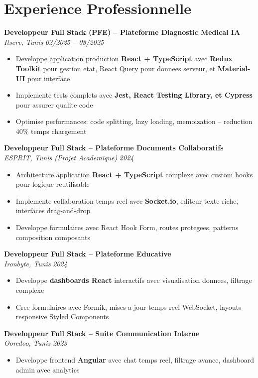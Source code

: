 \documentclass[10pt,a4paper]{article}
\begin{document}
\section*{Experience Professionnelle}
{\small

\textbf{Developpeur Full Stack (PFE) -- Plateforme Diagnostic Medical IA}\\[1pt]
\textit{Itserv, Tunis} \hfill \textit{02/2025 -- 08/2025}
\begin{itemize}[leftmargin=12pt,itemsep=2pt,topsep=3pt,parsep=0pt]
  \item Developpe application production \textbf{React + TypeScript} avec \textbf{Redux Toolkit} pour gestion etat, React Query pour donnees serveur, et \textbf{Material-UI} pour interface
  \item Implemente tests complets avec \textbf{Jest, React Testing Library, et Cypress} pour assurer qualite code
  \item Optimise performances: code splitting, lazy loading, memoization -- reduction 40\% temps chargement
\end{itemize}

\vspace{3pt}
\textbf{Developpeur Full Stack -- Plateforme Documents Collaboratifs}\\[1pt]
\textit{ESPRIT, Tunis (Projet Academique)} \hfill \textit{2024}
\begin{itemize}[leftmargin=12pt,itemsep=2pt,topsep=3pt,parsep=0pt]
  \item Architecture application \textbf{React + TypeScript} complexe avec custom hooks pour logique reutilisable
  \item Implemente collaboration temps reel avec \textbf{Socket.io}, editeur texte riche, interfaces drag-and-drop
  \item Developpe formulaires avec React Hook Form, routes protegees, patterns composition composants
\end{itemize}

\vspace{3pt}
\textbf{Developpeur Full Stack -- Plateforme Educative}\\[1pt]
\textit{Ironbyte, Tunis} \hfill \textit{2024}
\begin{itemize}[leftmargin=12pt,itemsep=2pt,topsep=3pt,parsep=0pt]
  \item Developpe \textbf{dashboards React} interactifs avec visualisation donnees, filtrage complexe
  \item Cree formulaires avec Formik, mises a jour temps reel WebSocket, layouts responsive Styled Components
\end{itemize}

\vspace{3pt}
\textbf{Developpeur Full Stack -- Suite Communication Interne}\\[1pt]
\textit{Ooredoo, Tunis} \hfill \textit{2023}
\begin{itemize}[leftmargin=12pt,itemsep=2pt,topsep=3pt,parsep=0pt]
  \item Developpe frontend \textbf{Angular} avec chat temps reel, filtrage avance, dashboard admin avec analytics
\end{itemize}

}
\end{document}
